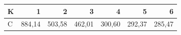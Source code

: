\begin{tabular}{lrrrrrr}
\toprule
K & 1 & 2 & 3 & \textbf{4} & 5 & 6 \\
\midrule
C & 884{,}14 & 503{,}58 & 462{,}01 & 300{,}60 & 292{,}37 & 285{,}47 \\
\bottomrule
\end{tabular}
